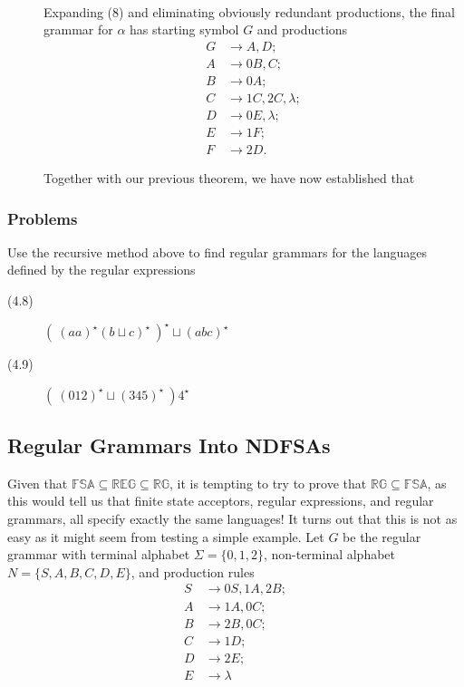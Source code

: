 \documentclass{article}
\begin{document}
\begin{description}
  \item[\ \ \ \ \ \ ] Expanding (8) and eliminating obviously redundant productions, the final grammar for $\alpha$ has starting symbol $G$ and productions
  \begin{align*}
  G & \to A,D; \\
  A & \to 0B,C; \\
  B & \to 0A; \\
  C & \to 1C,2C,\lambda; \\
  D & \to 0E,\lambda; \\
  E & \to 1F; \\
  F & \to 2D.
  \end{align*}

  Together with our previous theorem, we have now established that
  \begin{center}
  \end{center}

\end{description}


\subsubsection*{Problems}

Use the recursive method above to find regular grammars for the languages defined by the regular expressions

\begin{description}
  \item[(4.8)] $(\ (aa)^\star (b\sqcup c)^\star\ )^\star \sqcup (abc)^\star$
  \item[(4.9)] $(\ (012)^\star \sqcup(345)^\star\ ) 4^\star$
\end{description}


\subsection{Regular Grammars Into NDFSAs} %


Given that $\mathbb{FSA} \subseteq \mathbb{REG} \subseteq \mathbb{RG}$, it is tempting to try to prove that $\mathbb{RG} \subseteq \mathbb{FSA}$, as this would tell us that finite state acceptors, regular expressions, and regular grammars, all specify exactly the same languages! It turns out that this is not as easy as it might seem from testing a simple example. Let $G$ be the regular grammar with terminal alphabet $\Sigma = \{0,1,2\}$, non-terminal alphabet $N = \{S,A,B,C,D,E\}$, and production rules
\begin{align*}
S & \to 0S,1A,2B; \\
A & \to 1A,0C; \\
B & \to 2B,0C; \\
C & \to 1D; \\
D & \to 2E; \\
E & \to \lambda
\end{align*}
\end{document}
